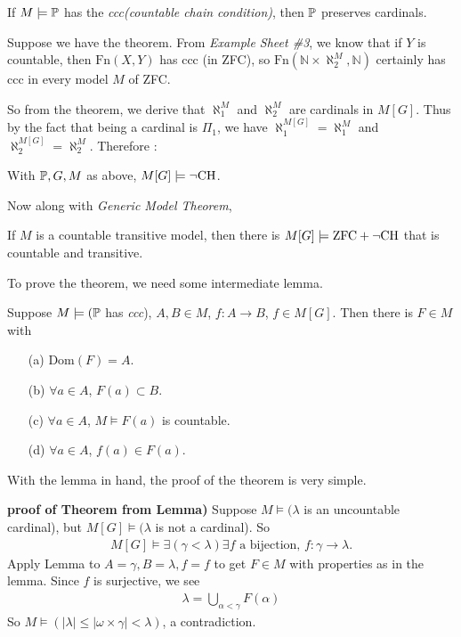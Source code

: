 \documentclass[12pt,a4paper]{article}
\newenvironment{proof}
{\begin{changemargin}{0.5cm}{0.5cm} 
	}%
	{\end{changemargin}
}
\newenvironment{p}
{\begin{proof} 
	}%
	{\end{proof}
}
\begin{document}
\thm If $M\models \mathbb{P}$ has the \emph{ccc(countable chain condition)}, then $\mathbb{P}$ preserves cardinals.
\s

Suppose we have the theorem. From \emph{Example Sheet \#3}, we know that if $Y$ is countable, then $\text{Fn}(X,Y)$ has ccc (in ZFC), so $\text{Fn}(\mathbb{N} \times \aleph_2^M, \mathbb{N})$ certainly has ccc in every model $M$ of ZFC.

\quad So from the theorem, we derive that $\aleph_1^M$ and $\aleph_2^M$ are cardinals in $M[G]$. Thus by the fact that being a cardinal is $\Pi_1$, we have $\aleph^{M[G]}_1 =\aleph_1^M$ and $\aleph_2^{M[G]} = \aleph_2^M$. Therefore :
\s

\corr With $\mathbb{P}, G, M$ as above, $M[G] \models \neg \text{CH}$.
\s

Now along with \emph{Generic Model Theorem},
\s

\corr If $M$ is a countable transitive model, then there is $M[G] \models \text{ZFC} + \neg \text{CH}$ that is countable and transitive.
\s

To prove the theorem, we need some intermediate lemma.
\s

\lem Suppose $M\models (\mathbb{P}$ has \emph{ccc}), $A, B\in M$, $f: A\rightarrow B$, $f \in M[G]$. Then there is $F\in M$ with
\begin{itemize}
\item[(a)] $\text{Dom}(F) = A$.
\item[(b)] $\forall a\in A$, $F(a) \subset B$.
\item[(c)] $\forall a\in A$, $M\models F(a)$ is countable.
\item[(d)] $\forall a\in A$, $f(a) \in F(a)$. 
\end{itemize}
\s

With the lemma in hand, the proof of the theorem is very simple.
\s

\begin{p}
\textbf{proof of Theorem from Lemma)} Suppose $M\models (\lambda$ is an uncountable cardinal), but $M[G] \models (\lambda$ is not a cardinal). So 
\begin{align*}
M[G] \models \exists (\gamma < \lambda) \exists f\text{ a bijection, } f: \gamma \rightarrow \lambda.
\end{align*}
Apply Lemma to $A= \gamma, B=\lambda, f=f$ to get $F \in M$ with properties as in the lemma. Since $f$ is surjective, we see
\begin{align*}
\lambda = \bigcup_{\alpha< \gamma} F(\alpha)
\end{align*}
So $M \models (|\lambda| \leq |\omega \times \gamma| <  \lambda )$, a contradiction.

\eop
\end{p}
\s
\end{document}
